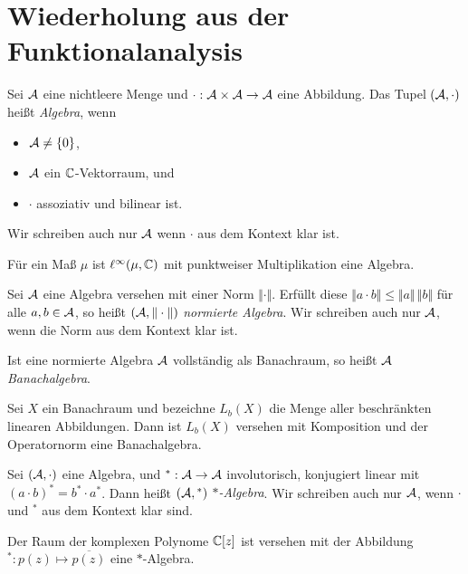 \chapter{Wiederholung aus der Funktionalanalysis}

\begin{definition}
    Sei $\mathcal{A}$ eine nichtleere Menge und $\cdot : \mathcal{A} \times \mathcal{A} \to \mathcal{A}$ eine Abbildung. Das Tupel $(\mathcal{A}, \cdot)$ heißt \emph{Algebra}, wenn
    \begin{itemize}
        \item $\mathcal{A} \neq \{ 0 \}$,
        \item $\mathcal{A}$ ein $\mathbb{C}$-Vektorraum, und
        \item $\cdot$ assoziativ und bilinear ist.
    \end{itemize}
    Wir schreiben auch nur $\mathcal{A}$ wenn $\cdot$ aus dem Kontext klar ist.
\end{definition}

\begin{example}
    Für ein Maß $\mu$ ist $\ell^\infty(\mu, \mathbb{C})$ mit punktweiser Multiplikation eine Algebra.
\end{example}

\begin{definition}
    Sei $\mathcal{A}$ eine Algebra versehen mit einer Norm $\Vert \cdot \Vert$. Erfüllt diese $\Vert a \cdot b \Vert \leq \Vert a \Vert \, \Vert b \Vert$ für alle $a, b \in \mathcal{A}$, so heißt $(\mathcal{A}, \Vert \cdot \Vert)$ \emph{normierte Algebra}. Wir schreiben auch nur $\mathcal{A}$, wenn die Norm aus dem Kontext klar ist.

    Ist eine normierte Algebra $\mathcal{A}$ vollständig als Banachraum, so heißt $\mathcal{A}$ \emph{Banachalgebra}.
\end{definition}

\begin{example}
    Sei $X$ ein Banachraum und bezeichne $L_b(X)$ die Menge aller beschränkten linearen Abbildungen. Dann ist $L_b(X)$ versehen mit Komposition und der Operatornorm eine Banachalgebra.
\end{example}

\begin{definition}
    Sei $(\mathcal{A}, \cdot)$ eine Algebra, und ${}^* : \mathcal{A} \to \mathcal{A}$ involutorisch, konjugiert linear mit $(a \cdot b)^* = b^* \cdot a^*$. Dann heißt $(\mathcal{A}, {}^*)$ \emph{$\ast$-Algebra}. Wir schreiben auch nur $\mathcal{A}$, wenn $\cdot$ und ${}^*$ aus dem Kontext klar sind.
\end{definition}

\begin{example}
    Der Raum der komplexen Polynome $\mathbb{C}[z]$ ist versehen mit der Abbildung ${}^* : p(z) \mapsto \overline{p(z)}$ eine $\ast$-Algebra.
\end{example}

